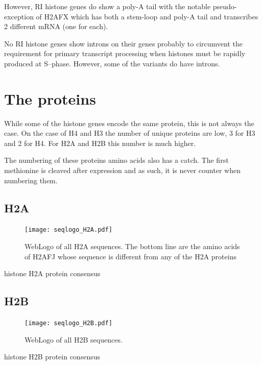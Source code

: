 \documentclass[10pt,a4paper,draft,article]{memoir}
\begin{document}
      However, RI histone genes do show a poly-A tail with the notable pseudo-exception of H2AFX which has both
      a stem-loop and poly-A tail and transcribes 2 different mRNA (one for each).

      No RI histone genes show introns on their genes probably to circumvent the requirement
      for primary transcript processing when histones must be rapidly produced at S--phase.
      However, some of the variants do have introns.

  \section{The proteins}
    While some of the histone genes encode the same protein, this is not always the case. On the case of H4 and H3  the number of unique proteins are low, 3 for H3 and 2 for H4. For H2A and H2B
    this number is much higher.

    The numbering of these proteins amino acids also has a catch. The first methionine is cleaved after expression and as such, it is
    never counter when numbering them.

    \subsection{H2A}
      \begin{figure}
        \centering
        \texttt{[image: seqlogo\_H2A.pdf]}
        \caption{WebLogo of all H2A sequences. The bottom line are the amino acids of H2AFJ whose sequence is different from any of the H2A proteins}
        \label{fig:h2a-weblogo}
      \end{figure}
      \begin{table}
        \caption{histone H2A protein consensus}
        \label{tab:H2A-consensus}
        \centering
        
      \end{table}


    \subsection{H2B}
      \begin{figure}
        \centering
        \texttt{[image: seqlogo\_H2B.pdf]}
        \caption{WebLogo of all H2B sequences.}
        \label{fig:h2b-weblogo}
      \end{figure}
      \begin{table}
        \caption{histone H2B protein consensus}
        \label{tab:H2B-consensus}
        \centering
        
      \end{table}
\end{document}
